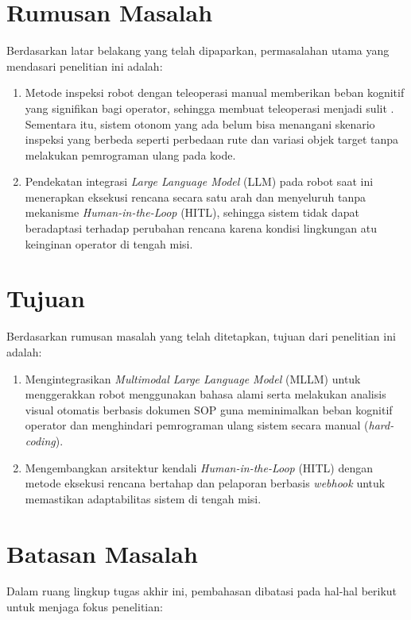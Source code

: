 \section{Rumusan Masalah}
Berdasarkan latar belakang yang telah dipaparkan, permasalahan utama yang mendasari penelitian ini adalah:

\begin{enumerate}
    \item Metode inspeksi robot dengan teleoperasi manual memberikan beban kognitif yang signifikan bagi operator, sehingga membuat teleoperasi menjadi sulit \cite{rea2022still}. Sementara itu, sistem otonom yang ada belum bisa menangani skenario inspeksi yang berbeda seperti perbedaan rute dan variasi objek target tanpa melakukan pemrograman ulang pada kode.
    
    \item Pendekatan integrasi \textit{Large Language Model} (LLM) pada robot saat ini menerapkan eksekusi rencana secara satu arah dan menyeluruh tanpa mekanisme \textit{Human-in-the-Loop} (HITL), sehingga sistem tidak dapat beradaptasi terhadap perubahan rencana karena kondisi lingkungan atu keinginan operator di tengah misi.
    
\end{enumerate}

\section{Tujuan}
Berdasarkan rumusan masalah yang telah ditetapkan, tujuan dari penelitian ini adalah:

\begin{enumerate}
    \item Mengintegrasikan \textit{Multimodal Large Language Model} (MLLM) untuk menggerakkan robot menggunakan bahasa alami serta melakukan analisis visual otomatis berbasis dokumen SOP guna meminimalkan beban kognitif operator dan menghindari pemrograman ulang sistem secara manual (\textit{hard-coding}).
    
    \item Mengembangkan arsitektur kendali \textit{Human-in-the-Loop} (HITL) dengan metode eksekusi rencana bertahap dan pelaporan berbasis \textit{webhook} untuk memastikan adaptabilitas sistem di tengah misi.
    
\end{enumerate}

\section{Batasan Masalah}
Dalam ruang lingkup tugas akhir ini, pembahasan dibatasi pada hal-hal berikut untuk menjaga fokus penelitian:

